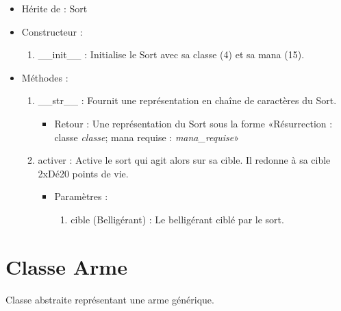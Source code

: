 \documentclass[12pt,pdftex,oneside]{article}
\begin{document}
  \begin{itemize}
  \item Hérite de : Sort


  \item Constructeur : 

  \begin{enumerate}
  \item \_\_init\_\_ : Initialise le Sort avec sa classe (4) et sa mana (15).

  \end{enumerate}

  \item Méthodes : 

    \begin{enumerate}
    \item __str__ : Fournit une représentation en chaîne de caractères du Sort.
      \begin{itemize}
      \item Retour : Une représentation du Sort sous la forme «Résurrection : classe \emph{classe}; mana requise : \emph{mana_requise}»
      \end{itemize}
    \item activer : Active le sort qui agit alors sur sa cible. Il redonne à sa
      cible 2xDé20 points de vie.
      \begin{itemize}
      \item Paramètres : 
        \begin{enumerate}
        \item cible (Belligérant) : Le belligérant ciblé par le sort.
        \end{enumerate}
      \end{itemize}
    \end{enumerate}

  \end{itemize}

  \section {Classe Arme}

  Classe abstraite représentant une arme générique.
\end{document}
